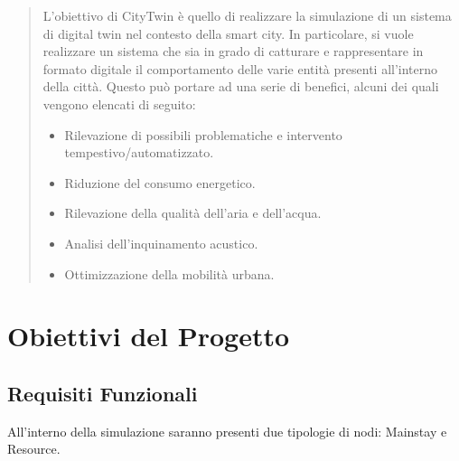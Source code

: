 \documentclass[12pt,a4paper,openright,twoside]{book}
\begin{document}
	
\frontmatter



\begin{abstract}
    L'obiettivo di CityTwin è quello di realizzare la simulazione di un sistema di digital twin nel contesto della smart city. In particolare, si vuole realizzare un sistema che sia in grado di catturare e rappresentare in formato digitale il comportamento delle varie entità presenti all'interno della città. Questo può portare ad una serie di benefici, alcuni dei quali vengono elencati di seguito:
    \begin{itemize}
        \item Rilevazione di possibili problematiche e intervento tempestivo/automatizzato.
        \item Riduzione del consumo energetico.
        \item Rilevazione della qualità dell'aria e dell'acqua.
        \item Analisi dell'inquinamento acustico.
        \item Ottimizzazione della mobilità urbana.
    \end{itemize}
\end{abstract}

\tableofcontents   

\mainmatter

\chapter{Obiettivi del Progetto}
\label{chap:goals}

\section{Requisiti Funzionali}

All'interno della simulazione saranno presenti due tipologie di nodi: Mainstay e Resource.
\end{document}
